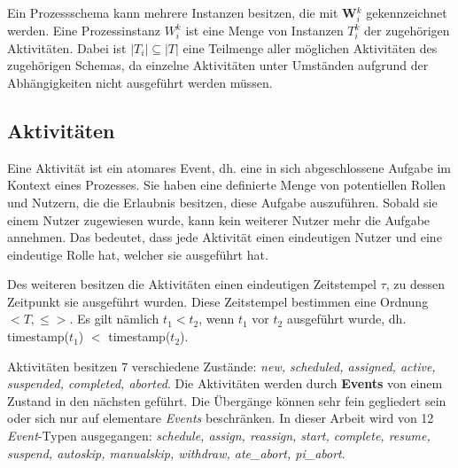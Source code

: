 Ein Prozessschema kann mehrere Instanzen besitzen, die mit \textbf{W$_i^k$} gekennzeichnet werden.
Eine Prozessinstanz $W_i^k$ ist eine Menge von Instanzen $T_i^k$ der zugehörigen Aktivitäten. Dabei ist $|T_i| \subseteq |T|$ eine Teilmenge aller möglichen Aktivitäten des zugehörigen Schemas, da einzelne Aktivitäten unter Umständen aufgrund der Abhängigkeiten nicht ausgeführt werden müssen.


\subsection{Aktivitäten}
\label{sec:activities}
Eine Aktivität ist ein atomares Event, dh. eine in sich abgeschlossene Aufgabe im Kontext eines Prozesses. Sie haben eine definierte Menge von potentiellen Rollen und Nutzern, die die Erlaubnis besitzen, diese Aufgabe auszuführen. Sobald sie einem Nutzer zugewiesen wurde, kann kein weiterer Nutzer mehr die Aufgabe annehmen. Das bedeutet, dass jede Aktivität einen eindeutigen Nutzer und eine eindeutige Rolle hat, welcher sie ausgeführt hat.

Des weiteren besitzen die Aktivitäten einen eindeutigen Zeitstempel $\tau$, zu dessen Zeitpunkt sie ausgeführt wurden. Diese Zeitstempel bestimmen eine Ordnung $<T, \leq>$. Es gilt nämlich $t_1 < t_2 $, wenn $t_1$ vor $t_2$ ausgeführt wurde, dh. timestamp($t_1$) $<$ timestamp($t_2$).

Aktivitäten besitzen 7 verschiedene Zustände: \textit{new, scheduled, assigned, active, suspended, completed, aborted}. Die Aktivitäten werden durch \textbf{Events} von einem Zustand in den nächsten geführt. Die Übergänge können sehr fein gegliedert sein oder sich nur auf elementare \textit{Events} beschränken. In dieser Arbeit wird von 12 \textit{Event}-Typen ausgegangen: \textit{schedule, assign, reassign, start, complete, resume, suspend, autoskip, manualskip, withdraw, ate\_abort, pi\_abort}.

